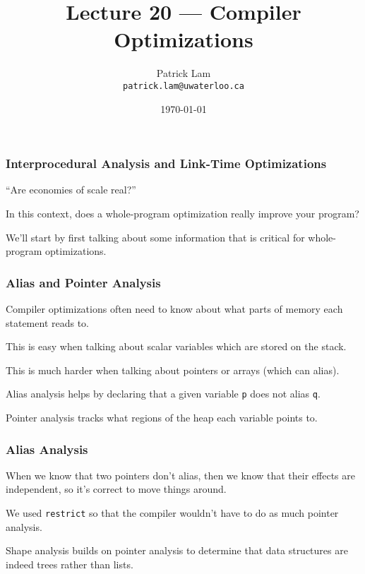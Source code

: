 

\title{Lecture 20 --- Compiler Optimizations }

\author{Patrick Lam \\ \small \texttt{patrick.lam@uwaterloo.ca}}
\date{\today}




\begin{frame}
  \titlepage

\end{frame}


\begin{frame}
\frametitle{Interprocedural Analysis and Link-Time Optimizations}

``Are economies of scale real?''

In this context, does a
whole-program optimization really improve your program?


We'll start by first talking about some information that is critical for
whole-program optimizations.

\end{frame}

\begin{frame}
\frametitle{Alias and Pointer Analysis}

Compiler optimizations often need
to know about what parts of memory each statement reads to.  

This is
easy when talking about scalar variables which are stored on the
stack. 

This is much harder when talking about pointers or arrays
(which can alias). 

\alert{Alias analysis} helps by declaring that a
given variable {\tt p} does not alias {\tt q}.

\alert{Pointer analysis} tracks what regions of the heap each variable points to.

\end{frame}

\begin{frame}
\frametitle{Alias Analysis}

When we know that two pointers don't alias, then we know that their
effects are independent, so it's correct to move things around.

We used {\tt restrict} so that the
compiler wouldn't have to do as much pointer analysis. 

Shape analysis
builds on pointer analysis to determine that data structures are indeed
trees rather than lists.


\end{frame}

